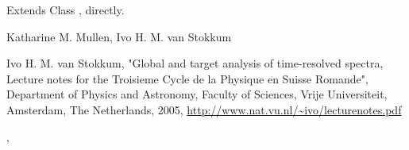 \begin{Section}{Extends}
Class , directly.
\end{Section}
\begin{Author}\relax
Katharine M. Mullen, Ivo H. M. van Stokkum
\end{Author}
\begin{References}\relax
Ivo H. M. van Stokkum, 
"Global and target analysis of time-resolved spectra, Lecture notes
for the Troisieme Cycle de la Physique en Suisse Romande", 
Department of Physics and Astronomy, Faculty of Sciences, Vrije Universiteit,
Amsterdam, The Netherlands, 2005, 
\url{http://www.nat.vu.nl/~ivo/lecturenotes.pdf}
\end{References}
\begin{SeeAlso}\relax
{},
\end{SeeAlso}

